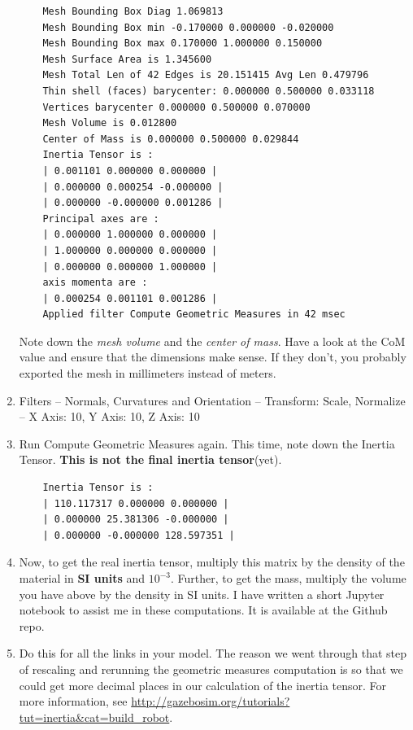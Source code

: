 \documentclass{article}
\begin{document}
\begin{enumerate}
\begin{verbatim}
    Mesh Bounding Box Diag 1.069813 
    Mesh Bounding Box min -0.170000 0.000000 -0.020000
    Mesh Bounding Box max 0.170000 1.000000 0.150000
    Mesh Surface Area is 1.345600
    Mesh Total Len of 42 Edges is 20.151415 Avg Len 0.479796
    Thin shell (faces) barycenter: 0.000000 0.500000 0.033118
    Vertices barycenter 0.000000 0.500000 0.070000
    Mesh Volume is 0.012800
    Center of Mass is 0.000000 0.500000 0.029844
    Inertia Tensor is :
    | 0.001101 0.000000 0.000000 |
    | 0.000000 0.000254 -0.000000 |
    | 0.000000 -0.000000 0.001286 |
    Principal axes are :
    | 0.000000 1.000000 0.000000 |
    | 1.000000 0.000000 0.000000 |
    | 0.000000 0.000000 1.000000 |
    axis momenta are :
    | 0.000254 0.001101 0.001286 |
    Applied filter Compute Geometric Measures in 42 msec
                \end{verbatim}
                Note down the \emph{mesh volume} and the \emph{center of mass}. Have a look at 
                the CoM value and ensure that the dimensions make sense. If they don't, you 
                probably exported the mesh in millimeters instead of meters.
                \item Filters -- Normals, Curvatures and Orientation -- Transform: Scale, Normalize
                -- X Axis: 10, Y Axis: 10, Z Axis: 10
                \item Run Compute Geometric Measures again. This time, note down the Inertia Tensor. 
                \textbf{This is not the final inertia tensor}(yet).
                \begin{verbatim}
    Inertia Tensor is :
    | 110.117317 0.000000 0.000000 |
    | 0.000000 25.381306 -0.000000 |
    | 0.000000 -0.000000 128.597351 |
                \end{verbatim}
                \item Now, to get the real inertia tensor, multiply this matrix by the density of the material
                in \textbf{SI units} and $10^{-3}$. Further, to get the mass, multiply the volume you have above 
                by the density in SI units. I have written a short Jupyter notebook to assist me in these computations.
                It is available at the Github repo.
                \item Do this for all the links in your model. The reason we went through that step 
                of rescaling and rerunning the geometric measures computation is so that we could get 
                more decimal places in our calculation of the inertia tensor. For more information, see 
                \url{http://gazebosim.org/tutorials?tut=inertia&cat=build_robot}.
            \end{enumerate}
\end{document}
